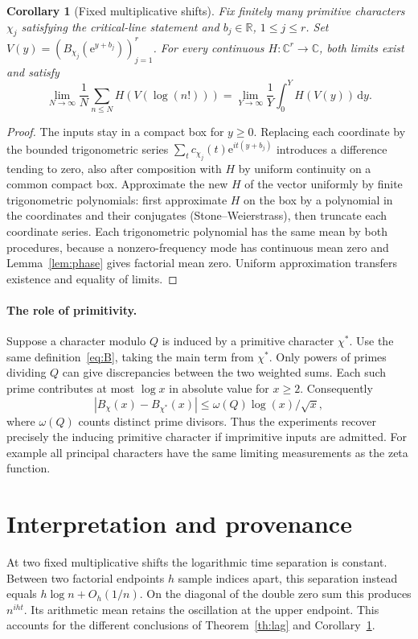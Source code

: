 \documentclass[11pt]{article}
\newtheorem{corollary}[theorem]{Corollary}
\newcommand{\R}{\mathbb R}
\newcommand{\C}{\mathbb C}
\newcommand{\e}{\mathrm e}
\newcommand{\dd}{\mathrm d}
\begin{document}
\begin{corollary}[Fixed multiplicative shifts]\label{cor:joint}
Fix finitely many primitive characters $\chi_j$ satisfying the
critical-line statement and $b_j\in\R$, $1\le j\le r$.
Set $V(y)=(B_{\chi_j}(\e^{y+b_j}))_{j=1}^r$. For every continuous
$H:\C^r\to\C$, both limits exist and satisfy
\[
 \lim_{N\to\infty}\frac1N\sum_{n\le N}H(V(\log(n!)))
 =\lim_{Y\to\infty}\frac1Y\int_0^Y H(V(y))\,\dd y.
\]
\end{corollary}
\begin{proof}
The inputs stay in a compact box for $y\ge0$. Replacing each
coordinate by the bounded trigonometric series
$\sum_t c_{\chi_j}(t)\e^{it(y+b_j)}$ introduces a difference tending
to zero, also after composition with $H$ by uniform continuity on
a common compact box. Approximate the new $H$ of the vector
uniformly by finite trigonometric polynomials: first approximate $H$
on the box by a polynomial in the coordinates and their conjugates
(Stone--Weierstrass), then truncate each coordinate series. Each
trigonometric polynomial has the same mean by both procedures,
because a nonzero-frequency mode has continuous mean zero and
Lemma~\ref{lem:phase} gives factorial mean zero. Uniform
approximation transfers existence and equality of limits.
\end{proof}

\paragraph{The role of primitivity.}
Suppose a character modulo $Q$ is induced by a primitive character
$\chi^*$. Use the same definition~\eqref{eq:B}, taking the main term
from $\chi^*$. Only powers of primes dividing $Q$ can give discrepancies
between the two weighted sums. Each such prime contributes at most
$\log x$ in absolute value for $x\ge2$. Consequently
\[
 |B_\chi(x)-B_{\chi^*}(x)|\le
 \omega(Q)\log(x)/\sqrt x,
\]
where $\omega(Q)$ counts distinct prime divisors. Thus the experiments
recover precisely the inducing primitive character if imprimitive
inputs are admitted. For example all principal characters have the
same limiting measurements as the zeta function.

\newpage
\section{Interpretation and provenance}
At two fixed multiplicative shifts the logarithmic time separation is
constant. Between two factorial endpoints $h$ sample indices apart,
this separation instead equals $h\log n+O_h(1/n)$. On the diagonal
of the double zero sum this produces $n^{iht}$. Its arithmetic mean
retains the oscillation at the upper endpoint. This accounts for the
different conclusions of Theorem~\ref{th:lag} and
Corollary~\ref{cor:joint}.
\end{document}
